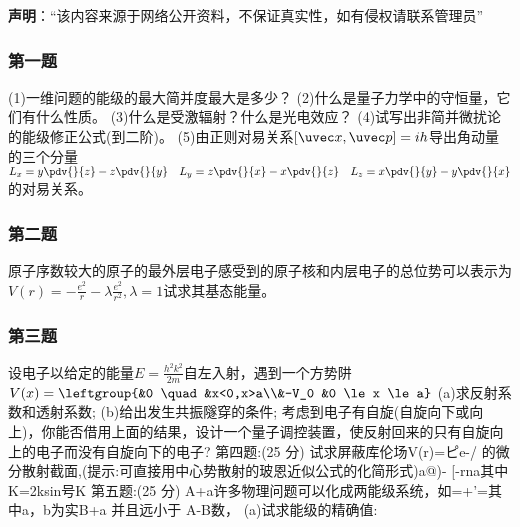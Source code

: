 


\textbf{声明}：“该内容来源于网络公开资料，不保证真实性，如有侵权请联系管理员”

\subsubsection{第一题}
(1)一维问题的能级的最大简并度最大是多少？
(2)什么是量子力学中的守恒量，它们有什么性质。
(3)什么是受激辐射？什么是光电效应？
(4)试写出非简并微扰论的能级修正公式(到二阶)。
(5)由正则对易关系$[\uvec x,\uvec p]=ih$导出角动量的三个分量$\displaystyle L_x=y\pdv{}{z}-z\pdv{}{y}  \quad L_y=z\pdv{}{x}-x\pdv{}{z} \quad L_z=x\pdv{}{y}-y\pdv{}{x}$
的对易关系。
\subsubsection{第二题}
原子序数较大的原子的最外层电子感受到的原子核和内层电子的总位势可以表示为$\displaystyle V(r)=-\frac{e^2}{r}-\lambda\frac{e^2}{r^2},\lambda=1$试求其基态能量。
\subsubsection{第三题}
设电子以给定的能量$E=\frac{h^2k^2}{2m}$自左入射，遇到一个方势阱$V(x)=\leftgroup{&0 \quad &x<0,x>a\\&-V_0 &0 \le x \le a}$
(a)求反射系数和透射系数;
(b)给出发生共振隧穿的条件;
考虑到电子有自旋(自旋向下或向上)，你能否借用上面的结果，设计一个量子调控装置，使反射回来的只有自旋向上的电子而没有自旋向下的电子?
第四题:(25 分)
试求屏蔽库伦场V(r)=ピe-/ 的微分散射截面,(提示:可直接用中心势散射的玻恩近似公式的化简形式)a@)- [-rna其中K=2ksin号K
第五题:(25 分)
A+a许多物理问题可以化成两能级系统，如=+'=其中a，b为实B+a
并且远小于 A-B数，
(a)试求能级的精确值: